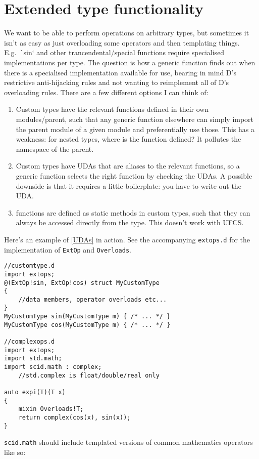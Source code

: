 \documentclass[10pt,a5paper,DIV=13]{scrartcl}
\begin{document}
\section{Extended type functionality}
We want to be able to perform operations on arbitrary types, but sometimes it isn't as easy as just overloading some operators and then templating things. E.g.\ \texttt`sin` and other trancendental/special functions require specialised implementations per type. The question is how a generic function finds out when there is a specialised implementation available for use, bearing in mind D's restrictive anti-hijacking rules and not wanting to reimplement all of D's overloading rules. There are a few different options I can think of:
\begin{enumerate}
    \item Custom types have the relevant functions defined in their own modules/parent, such that any generic function elsewhere can simply import the parent module of a given module and preferentially use those. This has a weakness: for nested types, where is the function defined? It pollutes the namespace of the parent.
    \item Custom types have UDAs that are aliases to the relevant functions, so a generic function selects the right function by checking the UDAs. A possible downside is that it requires a little boilerplate: you have to write out the UDA.\label{UDAs}
    \item functions are defined as static methods in custom types, such that they can always be accessed directly from the type. This doesn't work with UFCS.
\end{enumerate}

Here's an example of \ref{UDAs} in action. See the accompanying \texttt{extops.d} for the implementation of \texttt{ExtOp} and \texttt{Overloads}.
\begin{verbatim}
//customtype.d
import extops;
@(ExtOp!sin, ExtOp!cos) struct MyCustomType
{
    //data members, operator overloads etc...
}
MyCustomType sin(MyCustomType m) { /* ... */ }
MyCustomType cos(MyCustomType m) { /* ... */ }

//complexops.d
import extops;
import std.math;
import scid.math : complex;
    //std.complex is float/double/real only

auto expi(T)(T x)
{
    mixin Overloads!T;
    return complex(cos(x), sin(x));
}
\end{verbatim}

\texttt{scid.math} should include templated versions of common mathematics operators like so:
\end{document}
